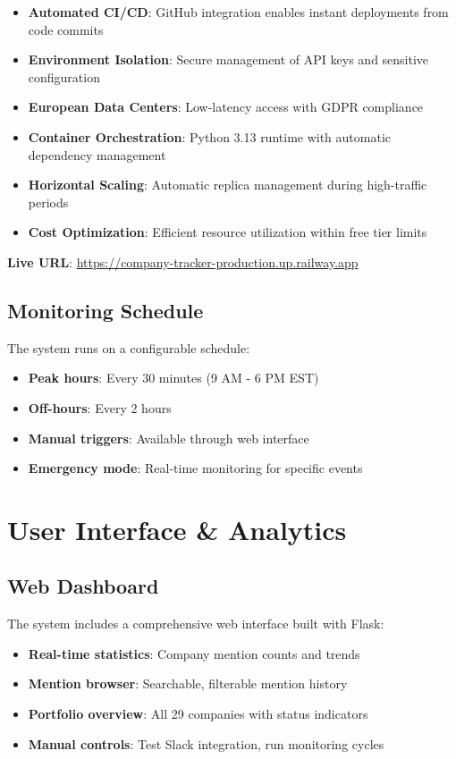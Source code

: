 \documentclass[11pt]{article}
\begin{document}
\begin{itemize}
    \item \textbf{Automated CI/CD}: GitHub integration enables instant deployments from code commits
    \item \textbf{Environment Isolation}: Secure management of API keys and sensitive configuration
    \item \textbf{European Data Centers}: Low-latency access with GDPR compliance
    \item \textbf{Container Orchestration}: Python 3.13 runtime with automatic dependency management
    \item \textbf{Horizontal Scaling}: Automatic replica management during high-traffic periods
    \item \textbf{Cost Optimization}: Efficient resource utilization within free tier limits
\end{itemize}

\textbf{Live URL}: \url{https://company-tracker-production.up.railway.app}

\subsection{Monitoring Schedule}

The system runs on a configurable schedule:
\begin{itemize}
    \item \textbf{Peak hours}: Every 30 minutes (9 AM - 6 PM EST)
    \item \textbf{Off-hours}: Every 2 hours
    \item \textbf{Manual triggers}: Available through web interface
    \item \textbf{Emergency mode}: Real-time monitoring for specific events
\end{itemize}

\section{User Interface \& Analytics}

\subsection{Web Dashboard}

The system includes a comprehensive web interface built with Flask:

\begin{itemize}
    \item \textbf{Real-time statistics}: Company mention counts and trends
    \item \textbf{Mention browser}: Searchable, filterable mention history
    \item \textbf{Portfolio overview}: All 29 companies with status indicators
    \item \textbf{Manual controls}: Test Slack integration, run monitoring cycles
\end{itemize}
\end{document}
